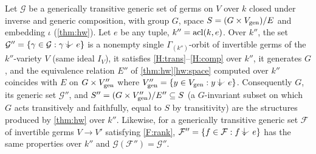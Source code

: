 \begin{lemma}\label{lem:hw-basechange}
Let $\mathcal G$ be a generically transitive generic set of germs on $V$ over $k$ closed
under inverse and generic composition, with group $G$, space $S=(G\times V_{\operatorname{gen}})/E$
and embedding $\iota$ (\cref{thm:hw}).  Let $e$ be any tuple, $k''=\operatorname{acl}(k,e)$.  Over
$k''$, the set $\mathcal G''=\{\gamma\in\mathcal G:\gamma\ind{}e\}$ is a nonempty single
$\Gamma_{(k'')}$-orbit of invertible germs of the $k''$-variety $V$ (same ideal $I_V$), it
satisfies \ref{H:trans}--\ref{H:comp} over $k''$, it generates $G$, and the equivalence
relation $E''$ of \cref{thm:hw}\ref{hw:space} computed over $k''$ coincides with $E$ on
$G\times V''_{\operatorname{gen}}$ where $V''_{\Gen}=\{y\in V_{\Gen}:y\ind{}e\}$.  Consequently $G$, its
generic set $\mathcal G''$, and $S''=(G\times V''_{\operatorname{gen}})/E''\subseteq S$ (a $G$-invariant
subset on which $G$ acts transitively and faithfully, equal to $S$ by transitivity) are the
structures produced by \cref{thm:hw} over $k''$.  Likewise, for a generically transitive
generic set $\mathcal F$ of invertible germs $V\to V'$ satisfying \ref{F:rank},
$\mathcal F''=\{f\in\mathcal F:f\ind{}e\}$ has the same properties over $k''$ and
$\mathcal G(\mathcal F'')=\mathcal G''$.
\end{lemma}
